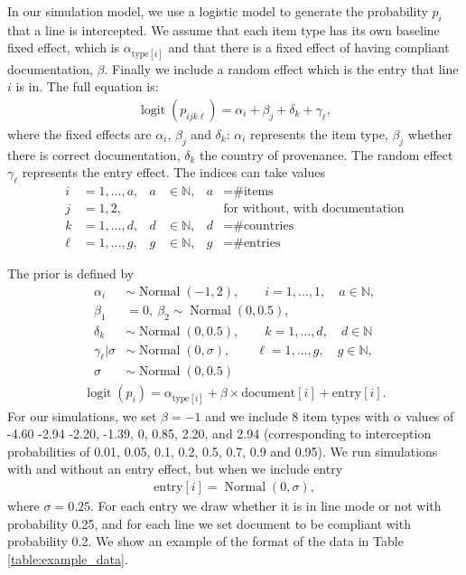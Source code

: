 \documentclass{article}
\DeclareMathOperator{\logit}{logit}
\DeclareMathOperator{\Normal}{Normal}
\begin{document}
In our simulation model, we use a logistic model to generate the probability \(p_i\) that a line is intercepted. We assume that each item type has its own baseline fixed effect, which is \(\alpha_{\text{type}[i]}\) and that there is a fixed effect of having compliant documentation, \(\beta\). Finally we include a random effect which is the entry that line \(i\) is in. The full equation is:
\begin{align}
\logit(p_{ijk\ell}) = \alpha_{i} + \beta_j + \delta_k + \gamma_\ell \label{eq:logit_model_sim},
\end{align}
where the fixed effects are $\alpha_i$, $\beta_j$ and $\delta_k$: $\alpha_i$ represents the item type, $\beta_j$ whether there is correct documentation, $\delta_k$ the country of provenance. The random effect $\gamma_\ell$ represents the entry effect. The indices can take values
\begin{align}
i &=1, \ldots, a, & a&\in \mathbb{N},& a &= \text{\# items}\\
j &=1, 2, & & & &\text{for without, with documentation}\\
k &= 1,\ldots, d,& d &\in \mathbb{N},& d &= \text{\# countries}\\
\ell &= 1,\ldots,g,& g&\in \mathbb{N},& g &= \text{\# entries}
\end{align}


The prior is defined by
\begin{align}
\alpha_i &\sim \Normal(-1, 2), \qquad i=1, \ldots, 1, \quad a\in \mathbb{N},\\
\beta_1 &= 0 , \ \beta_2 \sim \Normal(0, 0.5),\\
\delta_k &\sim \Normal(0, 0.5), \qquad k = 1,\ldots, d, \quad d \in \mathbb{N}\\
\gamma_\ell | \sigma &\sim \Normal(0, \sigma), \qquad \ell = 1,\ldots, g, \quad g\in \mathbb{N},\\
\sigma &\sim \Normal(0, 0.5)
\end{align}
{\color{gray} 
\begin{align}
\logit(p_i) = \alpha_{\text{type}[i]} + \beta\times\text{document}[i] + \text{entry}[i]. \label{eq:logit_model_sim}
\end{align}
For our simulations, we set \(\beta=-1\) and we include 8 item types with \(\alpha\) values 	of -4.60 -2.94 -2.20, -1.39, 0, 0.85, 2.20, and 2.94 (corresponding to interception probabilities of 0.01, 0.05, 0.1, 0.2, 0.5, 0.7, 0.9 and 0.95). We run simulations with and without an entry effect, but when we include entry
\begin{align}
\text{entry}[i] = \Normal(0, \sigma),
\end{align}
where \(\sigma = 0.25\). For each entry we draw whether it is in line mode or not with probability 0.25, and for each line we set document to be compliant with probability 0.2. We show an example of the format of the data in Table \ref{table:example_data}. 
}
\end{document}
